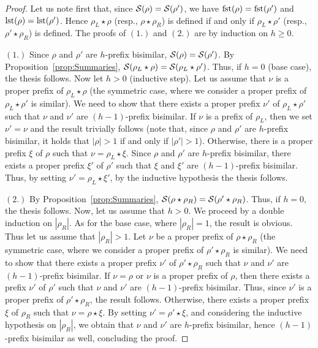\begin{proof}
Let us note first that, since $\mathcal{S}(\rho)=\mathcal{S}(\rho')$, we have $\operatorname{fst}(\rho)=\operatorname{fst}(\rho')$ and $\operatorname{lst}(\rho)=\operatorname{lst}(\rho')$.
Hence $\rho_L\star \rho$ (resp., $\rho\star \rho_R$) is defined if and only if  $\rho_L\star \rho'$ (resp., $\rho'\star \rho_R$) is defined.
The proofs of $(1.)$ and $(2.)$ are by induction on $h\geq 0$.

$(1.)$ Since $\rho$ and $\rho'$ are $h$-prefix bisimilar, $\mathcal{S}(\rho)=\mathcal{S}(\rho')$. By Proposition~\ref{prop:Summaries},
 $\mathcal{S}(\rho_L\star \rho)=\mathcal{S}(\rho_L\star \rho')$. Thus, if $h=0$ (base case), the thesis follows. Now let $h>0$ (inductive step). Let us assume that $\nu$ is a proper prefix of
 $\rho_L\star\rho$ (the symmetric case, where we consider a proper prefix of $\rho_L\star \rho'$ is similar). We need to show that there exists a proper prefix $\nu'$ of
 $\rho_L\star\rho'$ such that $\nu$ and $\nu'$ are $(h-1)$-prefix bisimilar. If $\nu$ is a prefix of $\rho_L$, then we set $\nu'=\nu$ and the result trivially follows (note that, since $\rho$ and $\rho'$ are $h$-prefix bisimilar, it holds that $|\rho|>1$ if and only if $|\rho'|>1$). Otherwise, there is a proper prefix $\xi$ of $\rho$ such that
 $\nu=\rho_L\star \xi$. Since $\rho$ and $\rho'$ are $h$-prefix bisimilar, there exists a proper prefix $\xi'$ of $\rho'$ such that $\xi$ and $\xi'$ are $(h-1)$-prefix bisimilar.
Thus, by setting $\nu'=\rho_L\star \xi'$, by the inductive hypothesis the thesis follows.

$(2.)$ By Proposition~\ref{prop:Summaries},
 $\mathcal{S}(\rho\star \rho_R)=\mathcal{S}(\rho'\star \rho_R)$. Thus, if $h=0$, the thesis follows. Now, let us assume that $h>0$.
We proceed by a double  induction on $|\rho_R|$. As for the base case, where $|\rho_R|=1$, the result is obvious. Thus let us assume that $|\rho_R|>1$.
  Let $\nu$ be a proper prefix of
 $\rho\star\rho_R$ (the symmetric case, where we consider a proper prefix of $\rho'\star \rho_R$ is similar). We need to show that there exists a proper prefix $\nu'$ of
 $\rho'\star\rho_R$ such that $\nu$ and $\nu'$ are $(h-1)$-prefix bisimilar. If $\nu=\rho$ or $\nu$ is a proper prefix of $ \rho$, then there exists a prefix $\nu'$ of
 $ \rho'$ such that $\nu$ and $\nu'$ are $(h-1)$-prefix bisimilar. Thus, since $\nu'$ is a proper prefix of $\rho'\star\rho_R$, the result follows.
 Otherwise, there exists a proper prefix $\xi$ of $\rho_R$ such that
 $\nu=\rho\star \xi$. By setting $\nu'=\rho'\star\xi$, and considering the inductive hypothesis on $|\rho_R|$, we obtain that $\nu$ and $\nu'$ are $h$-prefix bisimilar,
 hence $(h-1)$-prefix bisimilar as well, concluding the proof.
\end{proof}


